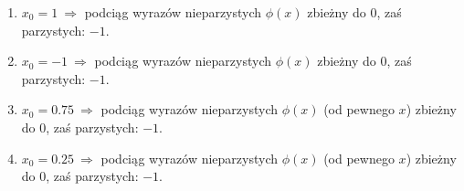 \documentclass{classrep}
\begin{document}
		\begin{enumerate}[1.]
			\item $x_0 = 1 ~\Rightarrow$ podciąg wyrazów nieparzystych $\phi(x)$ zbieżny do $0$, zaś parzystych: $-1$.
			\item $x_0 = -1 ~\Rightarrow$ podciąg wyrazów nieparzystych $\phi(x)$ zbieżny do $0$, zaś parzystych: $-1$.
			\item $x_0 = 0.75 ~\Rightarrow$ podciąg wyrazów nieparzystych $\phi(x)$ (od pewnego $x$) zbieżny do $0$, zaś parzystych: $-1$.
			\item $x_0 = 0.25 ~\Rightarrow$ podciąg wyrazów nieparzystych $\phi(x)$ (od pewnego $x$) zbieżny do $0$, zaś parzystych: $-1$.
		\end{enumerate}
\end{document}
